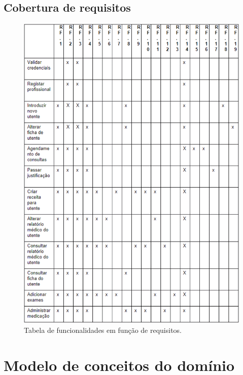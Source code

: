 \documentclass[11pt,a4paper,twoside]{report}
\begin{document}
\section{Cobertura de requisitos}

\begin{figure}[H]
	\centering
	\includegraphics[width=0.9\linewidth]{image/CoberturaRequisitos2}
	\caption{Tabela de funcionalidades em função de requisitos.}
	\label{fig:coberturarequisitos}
\end{figure}


\chapter{Modelo de conceitos do domínio}
\end{document}
